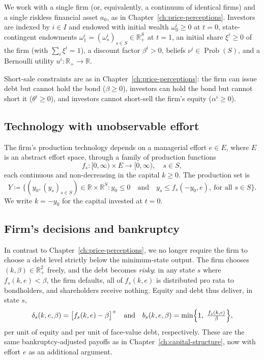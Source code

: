 \documentclass[11pt,a4paper,oneside]{book}
\def\R{\mathbb{R}}
\def\leq{\leqslant}
\def\geq{\geqslant}
\def\et{\quad \text{and} \quad}
\DeclareMathOperator{\Prob}{Prob}
\theoremstyle{plain}
\theoremstyle{definition}
\theoremstyle{remark}
\numberwithin{equation}{chapter}
\begin{document}
We work with a single firm (or, equivalently, a continuum of identical firms) and a single riskless financial asset $a_0$, as in Chapter~\ref{ch:price-perceptions}.
Investors are indexed by $i \in I$ and endowed with initial wealth $\omega^i_0 \geq 0$ at $t=0$, state-contingent endowments $\omega^i_1 = (\omega^i_s)_{s \in S} \in \R_+^S$ at $t=1$, an initial share $\xi^i \geq 0$ of the firm (with $\sum_i \xi^i = 1$), a discount factor $\beta^i > 0$, beliefs $\nu^i \in \Prob(S)$, and a Bernoulli utility $u^i : \R_+ \to \R$.

Short-sale constraints are as in Chapter~\ref{ch:price-perceptions}: the firm can issue debt but cannot hold the bond ($\beta \geq 0$), investors can hold the bond but cannot short it ($\theta^i \geq 0$), and investors cannot short-sell the firm's equity ($\alpha^i \geq 0$).

\subsection{Technology with unobservable effort}

The firm's production technology depends on a managerial effort $e \in E$, where $E$ is an abstract effort space, through a family of production functions
\begin{equation*}
  f_s : [0, \infty) \times E \to [0, \infty),
  \quad s \in S,
\end{equation*}
each continuous and non-decreasing in the capital $k \geq 0$.
The production set is
\begin{equation*}
  Y \coloneqq \bigl\{ (y_0, (y_s)_{s \in S}) \in \R \times \R^S \colon y_0 \leq 0 \et y_s \leq f_s(-y_0, e), \ \text{for all $s\in S$} \bigr\}.
\end{equation*}
We write $k = -y_0$ for the capital invested at $t=0$.

\subsection{Firm's decisions and bankruptcy}

In contrast to Chapter~\ref{ch:price-perceptions}, we no longer require the firm to choose a debt level strictly below the minimum-state output.
The firm chooses $(k, \beta) \in \R_+^2$ freely, and the debt becomes \emph{risky}: in any state $s$ where $f_s(k, e) < \beta$, the firm defaults, all of $f_s(k, e)$ is distributed pro rata to bondholders, and shareholders receive nothing.
Equity and debt thus deliver, in state $s$,
\begin{equation}\label{eq:div-debt-MH}
  \delta_s(k, e, \beta) = \bigl[ f_s(k, e) - \beta \bigr]^+
  \et
  b_s(k, e, \beta) = \min\Bigl\{ 1, \ \tfrac{f_s(k, e)}{\beta} \Bigr\},
\end{equation}
per unit of equity and per unit of face-value debt, respectively.
These are the same bankruptcy-adjusted payoffs as in Chapter~\ref{ch:capital-structure}, now with effort $e$ as an additional argument.
\end{document}
